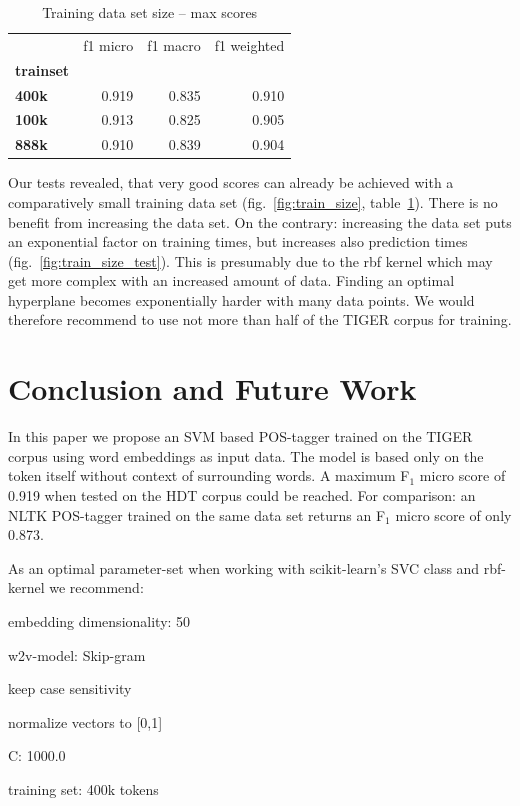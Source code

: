\documentclass[11pt,a4paper]{article}
\begin{document}
\begin{table}[htbp]
	\caption{Training data set size -- max scores}
	\label{tab:train_size}
	\centering
	\begin{tabular}{lrrr}
	\toprule
		{} &  f1 micro &  f1 macro &  f1 weighted \\
		\textbf{trainset} &           &           & \\
		\midrule
		\textbf{400k    } &  0.919 &  0.835 &     0.910 \\
		\textbf{100k    } &  0.913 &  0.825 &     0.905 \\
		\textbf{888k    } &  0.910 &  0.839 &     0.904 \\
		\bottomrule
	\end{tabular}
\end{table}

Our tests revealed, that very good scores can already be achieved with a comparatively small training data set (fig.~\ref{fig:train_size}, table~\ref{tab:train_size}). There is no benefit from increasing the data set. On the contrary: increasing the data set puts an exponential factor on training times, but increases also prediction times (fig.~\ref{fig:train_size_test}). This is presumably due to the rbf kernel which may get more complex with an increased amount of data. Finding an optimal hyperplane becomes exponentially harder with many data points. We would therefore recommend to use not more than half of the TIGER corpus for training.



\section{Conclusion and Future Work}
In this paper we propose an SVM based POS-tagger trained on the TIGER corpus using word embeddings as input data. The model is based only on the token itself without context of surrounding words. A maximum F$_1$ micro score of 0.919 when tested on the HDT corpus could be reached. For comparison: an NLTK POS-tagger trained on the same data set returns an F$_1$ micro score of only 0.873.

As an optimal parameter-set when working with scikit-learn's SVC class and rbf-kernel we recommend:
\begin{itemize*}
	\item embedding dimensionality: 50
	\item w2v-model: Skip-gram
	\item keep case sensitivity
	\item normalize vectors to [0,1]
	\item C: 1000.0
	\item training set: 400k tokens
\end{itemize*}
\end{document}
